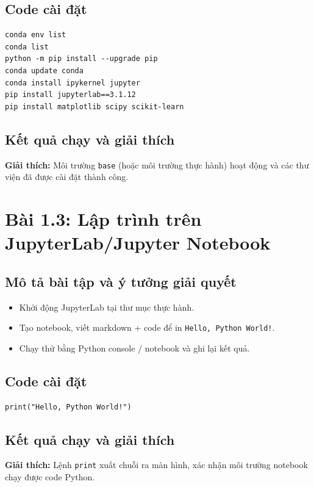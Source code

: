 \subsection{Code cài đặt}
\begin{lstlisting}
conda env list
conda list
python -m pip install --upgrade pip
conda update conda
conda install ipykernel jupyter
pip install jupyterlab==3.1.12
pip install matplotlib scipy scikit-learn
\end{lstlisting}

\subsection{Kết quả chạy và giải thích}

\textbf{Giải thích:} Môi trường \texttt{base} (hoặc môi trường thực hành) hoạt động và các thư viện đã được cài đặt thành công.

\section{Bài 1.3: Lập trình trên JupyterLab/Jupyter Notebook}
\subsection{Mô tả bài tập và ý tưởng giải quyết}
\begin{itemize}
  \item Khởi động JupyterLab tại thư mục thực hành.
  \item Tạo notebook, viết markdown + code để in \texttt{Hello, Python World!}.
  \item Chạy thử bằng Python console / notebook và ghi lại kết quả.
\end{itemize}

\subsection{Code cài đặt}
\begin{lstlisting}
print("Hello, Python World!")
\end{lstlisting}

\subsection{Kết quả chạy và giải thích}

\textbf{Giải thích:} Lệnh \texttt{print} xuất chuỗi ra màn hình, xác nhận môi trường notebook chạy được code Python.

\clearpage

